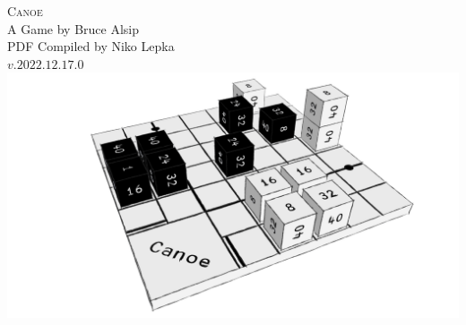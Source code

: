 



\begin{titlepage}
\begin{center}
    \Huge \textsc{Canoe}\\
    \LARGE A Game by Bruce Alsip\\
    \large PDF Compiled by Niko Lepka\\
    $v.2022.12.17.0$\\\vspace{1cm}
    \includegraphics[width=\textwidth]{../graphics/canoe-cover}
\end{center}
\newpage
\end{titlepage}
\tableofcontents\newpage









